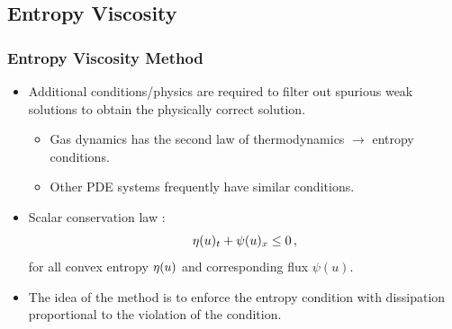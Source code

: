 \subsection{Entropy Viscosity}
\begin{frame}
\frametitle{Entropy Viscosity Method}

\begin{itemize}
  \item Additional conditions/physics are required to filter out
    spurious weak solutions to obtain the physically correct solution.
    \begin{itemize}
      \item Gas dynamics has the second law of thermodynamics
        $\rightarrow$ entropy conditions.
      \item Other PDE systems frequently have similar conditions.
    \end{itemize}
  \item Scalar conservation law :
    \begin{equation}
      \eta(u)_t + \psi(u)_x \leq 0 \,,
    \end{equation}
    for all convex entropy $\eta(u)$ and corresponding flux $\psi(u)$.
  \item The idea of the  method is to enforce
    the entropy condition with dissipation proportional to the violation
    of the condition.
\end{itemize}

\end{frame}
